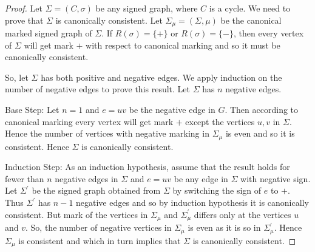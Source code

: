 \begin{proof}
Let $\Sigma=(C,\sigma)$ be any signed graph, where $C$ is a cycle. We need to prove that $\Sigma$ is canonically consistent. Let 
$\Sigma_\mu=(\Sigma, \mu)$ be the canonical marked signed graph of $\Sigma$.
If $R(\sigma)=\{+\}$ or $R(\sigma)=\{-\}$, then every vertex of $\Sigma$ will get mark $+$ with respect to canonical marking and 
so it must be canonically consistent.


So, let $\Sigma$ has both positive and negative edges.
We apply induction on the number of negative edges to prove this result.
Let $\Sigma$ has $n$ negative edges.

Base Step: Let $n=1$ and $e=uv$ be the negative edge in $G$. Then according to canonical marking every vertex will get mark $+$ 
except the vertices $u,v$ in $\Sigma$. Hence the number of vertices with negative marking in $\Sigma_\mu$ is even and so it 
is consistent. Hence $\Sigma$ is canonically consistent.

Induction Step: As an induction hypothesis, assume that the result holds for fewer than $n$ negative edges in 
$\Sigma$ and $e=uv$ be any edge in $\Sigma$  with negative sign. Let $\Sigma^\prime$ be the signed graph obtained from $\Sigma$ 
by 
switching the sign of $e$ to $+$. Thus $\Sigma^\prime$ has $n-1$ negative edges and so by induction hypothesis it is canonically 
consistent. But mark of the vertices in $\Sigma_\mu$ and $\Sigma^\prime_\mu$ differs only at the vertices $u$ and $v$. So, the 
number of negative vertices in $\Sigma_\mu$ is even as it is so in $\Sigma^\prime_\mu$. Hence $\Sigma_\mu$  is consistent and 
which in turn implies that $\Sigma$ is canonically consistent.


% 
\end{proof}
